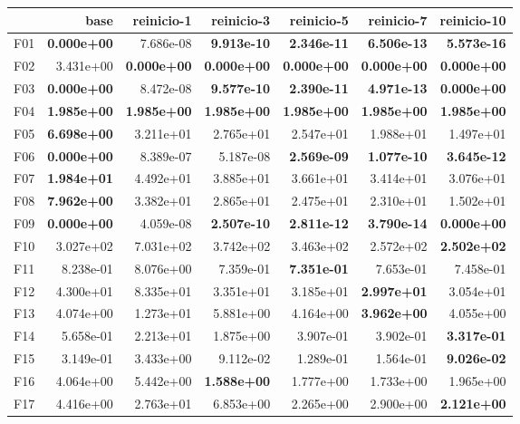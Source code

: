 \begin{tabular}{lrrrrrr}
\toprule
\textbf{} & \textbf{base} & \textbf{reinicio-1} & \textbf{reinicio-3} & \textbf{reinicio-5} & \textbf{reinicio-7} & \textbf{reinicio-10} \\
\midrule
F01 & \textbf{0.000e+00} & 7.686e-08 & \textbf{9.913e-10} & \textbf{2.346e-11} & \textbf{6.506e-13} & \textbf{5.573e-16} \\
F02 & 3.431e+00 & \textbf{0.000e+00} & \textbf{0.000e+00} & \textbf{0.000e+00} & \textbf{0.000e+00} & \textbf{0.000e+00} \\
F03 & \textbf{0.000e+00} & 8.472e-08 & \textbf{9.577e-10} & \textbf{2.390e-11} & \textbf{4.971e-13} & \textbf{0.000e+00} \\
F04 & \textbf{1.985e+00} & \textbf{1.985e+00} & \textbf{1.985e+00} & \textbf{1.985e+00} & \textbf{1.985e+00} & \textbf{1.985e+00} \\
F05 & \textbf{6.698e+00} & 3.211e+01 & 2.765e+01 & 2.547e+01 & 1.988e+01 & 1.497e+01 \\
F06 & \textbf{0.000e+00} & 8.389e-07 & 5.187e-08 & \textbf{2.569e-09} & \textbf{1.077e-10} & \textbf{3.645e-12} \\
F07 & \textbf{1.984e+01} & 4.492e+01 & 3.885e+01 & 3.661e+01 & 3.414e+01 & 3.076e+01 \\
F08 & \textbf{7.962e+00} & 3.382e+01 & 2.865e+01 & 2.475e+01 & 2.310e+01 & 1.502e+01 \\
F09 & \textbf{0.000e+00} & 4.059e-08 & \textbf{2.507e-10} & \textbf{2.811e-12} & \textbf{3.790e-14} & \textbf{0.000e+00} \\
F10 & 3.027e+02 & 7.031e+02 & 3.742e+02 & 3.463e+02 & 2.572e+02 & \textbf{2.502e+02} \\
F11 & 8.238e-01 & 8.076e+00 & 7.359e-01 & \textbf{7.351e-01} & 7.653e-01 & 7.458e-01 \\
F12 & 4.300e+01 & 8.335e+01 & 3.351e+01 & 3.185e+01 & \textbf{2.997e+01} & 3.054e+01 \\
F13 & 4.074e+00 & 1.273e+01 & 5.881e+00 & 4.164e+00 & \textbf{3.962e+00} & 4.055e+00 \\
F14 & 5.658e-01 & 2.213e+01 & 1.875e+00 & 3.907e-01 & 3.902e-01 & \textbf{3.317e-01} \\
F15 & 3.149e-01 & 3.433e+00 & 9.112e-02 & 1.289e-01 & 1.564e-01 & \textbf{9.026e-02} \\
F16 & 4.064e+00 & 5.442e+00 & \textbf{1.588e+00} & 1.777e+00 & 1.733e+00 & 1.965e+00 \\
F17 & 4.416e+00 & 2.763e+01 & 6.853e+00 & 2.265e+00 & 2.900e+00 & \textbf{2.121e+00} \\

\end{tabular}
